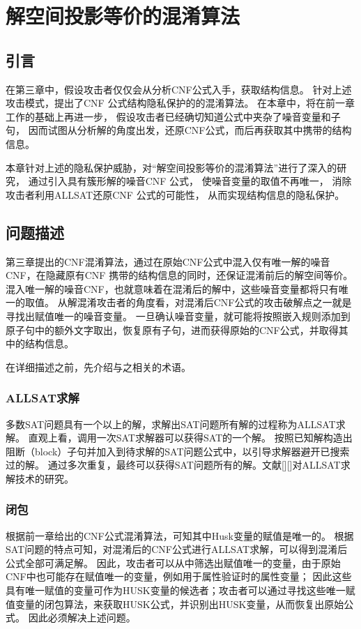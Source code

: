 \chapter{解空间投影等价的混淆算法}
\label{chap:4}

\section{引言}%
在第三章中，假设攻击者仅仅会从分析CNF公式入手，获取结构信息。
针对上述攻击模式，提出了CNF 公式结构隐私保护的的混淆算法。
在本章中，将在前一章工作的基础上再进一步，
假设攻击者已经确切知道公式中夹杂了噪音变量和子句，
因而试图从分析解的角度出发，还原CNF公式，而后再获取其中携带的结构信息。

本章针对上述的隐私保护威胁，对“解空间投影等价的混淆算法”进行了深入的研究，
通过引入具有簇形解的噪音CNF 公式，
使噪音变量的取值不再唯一，
消除攻击者利用ALLSAT还原CNF 公式的可能性，
从而实现结构信息的隐私保护。

\section{问题描述}
第三章提出的CNF混淆算法，通过在原始CNF公式中混入仅有唯一解的噪音CNF，在隐藏原有CNF 携带的结构信息的同时，还保证混淆前后的解空间等价。
混入唯一解的噪音CNF，也就意味着在混淆后的解中，这些噪音变量都将只有唯一的取值。
从解混淆攻击者的角度看，对混淆后CNF公式的攻击破解点之一就是寻找出赋值唯一的噪音变量。
一旦确认噪音变量，就可能将按照嵌入规则添加到原子句中的额外文字取出，恢复原有子句，进而获得原始的CNF公式，并取得其中的结构信息。

在详细描述之前，先介绍与之相关的术语。
\subsection{ALLSAT求解}
多数SAT问题具有一个以上的解，求解出SAT问题所有解的过程称为ALLSAT求解。
直观上看，调用一次SAT求解器可以获得SAT的一个解。
按照已知解构造出阻断（block）子句并加入到待求解的SAT问题公式中，以引导求解器避开已搜索过的解。
通过多次重复，最终可以获得SAT问题所有的解。文献[][]对ALLSAT求解技术的研究。

\subsection{闭包}

根据前一章给出的CNF公式混淆算法，可知其中Husk变量的赋值是唯一的。
根据SAT问题的特点可知，对混淆后的CNF公式进行ALLSAT求解，可以得到混淆后公式全部可满足解。
因此，攻击者可以从中筛选出赋值唯一的变量，由于原始CNF中也可能存在赋值唯一的变量，例如用于属性验证时的属性变量；
因此这些具有唯一赋值的变量可作为HUSK变量的候选者；攻击者可以通过寻找这些唯一赋值变量的闭包算法，来获取HUSK公式，并识别出HUSK变量，从而恢复出原始公式。
因此必须解决上述问题。



